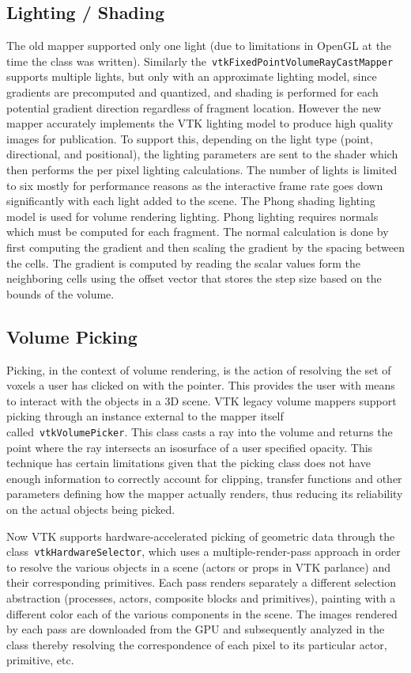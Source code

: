 \subsection{Lighting / Shading}
\label{lighting}
The old mapper supported only one light (due to limitations in OpenGL at the
time the class was written). Similarly
the~\texttt{vtkFixedPointVolumeRayCastMapper} supports multiple lights, but only
with an approximate lighting model, since gradients are precomputed and
quantized, and shading is performed for each potential gradient direction
regardless of fragment location. However the new mapper accurately implements
the VTK lighting model to produce high quality images for publication. To
support this, depending on the light type (point, directional, and positional),
the lighting parameters are sent to the shader which then performs the per pixel
lighting calculations. The number of lights is limited to six mostly for
performance reasons as the interactive frame rate goes down significantly with
each light added to the scene. The Phong shading lighting model is used for
volume rendering lighting. Phong lighting requires normals which must be
computed for each fragment. The normal calculation is done by first computing
the gradient and then scaling the gradient by the spacing between the cells. The
gradient is computed by reading the scalar values form the neighboring cells
using the offset vector that stores the step size based on the bounds of the
volume.

\subsection{Volume Picking}
\label{picking}
Picking, in the context of volume rendering, is the action of resolving the set
of voxels a user has clicked on with the pointer. This provides the user with
means to interact with the objects in a 3D scene. VTK legacy volume mappers
support picking through an instance external to the mapper itself
called~\texttt{vtkVolumePicker}.  This class casts a ray into the volume and
returns the point where the ray intersects an isosurface of a user specified
opacity.  This technique has certain limitations given that the picking class
does not have enough information to correctly account for clipping, transfer
functions and other parameters defining how the mapper actually renders, thus
reducing its reliability on the actual objects being picked.

Now VTK supports hardware-accelerated picking of geometric data through the
class~\texttt{vtkHardwareSelector}, which uses a multiple-render-pass approach
in order to resolve the various objects in a scene (actors or props in VTK
parlance) and their corresponding primitives.  Each pass renders separately a
different selection abstraction (processes, actors, composite blocks and
primitives), painting with a different color each of the various components in
the scene.  The images rendered by each pass are downloaded from the GPU and
subsequently analyzed in the class thereby resolving the correspondence of each
pixel to its particular actor, primitive, etc.

